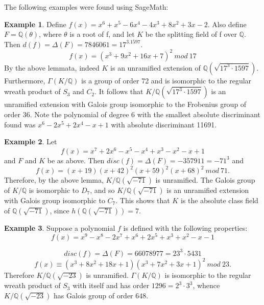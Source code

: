 \documentclass[12pt]{extarticle}
\newcommand{\Q}{\mathbb{Q}}
\newcommand{\<}{\langle}
\renewcommand{\>}{\rangle}
\theoremstyle{definition}
\newtheorem*{example}{Example}
\begin{document}
The following examples were found using SageMath:
\begin{example}
Define $f(x)=x^6 + x^5 - 6x^4 - 4x^3 + 8x^2 + 3x - 2$. Also define $F=\Q(\theta)$, where $\theta$ is a root of f, and let $K$ be the splitting field of f over $\Q$. Then $d(f)=\Delta(F)=7846061=17^3.1597$. 
\begin{equation}
   f(x)= (x^3 + 9x^2 + 16x + 7)^2\:mod\:17
\end{equation}
By the above lemmata, indeed $K$ is an unramified extension of $\Q(\sqrt{17^3 \cdot 1597})$. Furthermore, $\Gamma(K/\Q)$ is a group of order 72 and is isomorphic to the regular wreath product of $S_3$ and $C_2$. It follows that $K/\Q(\sqrt{17^3 \cdot 1597})$ is an unramified extension with Galois group isomorphic to the Frobenius group of order 36.
Note the polynomial of degree 6 with the smallest absolute discriminant found was $x^6 - 2x^5 + 2x^4 - x + 1$ with absolute discriminant 11691.
\end{example}
\begin{example}
 Let \begin{equation}
     f(x)=x^7 + 2x^6 - x^5 - x^4 + x^3 - x^2 - x + 1
 \end{equation}and $F$ and $K$ be as above.
Then $disc(f)=\Delta(F)=-357911=-71^{3}$ and
\begin{equation}
    f(x)=(x + 19)(x + 42)^2 (x + 59)^2(x + 68)^2\:mod\:71.
\end{equation}
Therefore, by the above lemma, $K/\Q(\sqrt{-71})$ is unramified. The Galois group of $K/\Q$
is isomorphic to $D_{7}$, and so $K/\Q(\sqrt{-71})$
is an unramified extension with Galois group isomorphic to $C_7$.
This shows that $K$ is the absolute class field of $\Q(\sqrt{-71})$, since $h(\Q(\sqrt{-71}))=7$.
\end{example}
\begin{example}
    Suppose a polynomial $f$ is defined with the following properties: \begin{equation}
        f(x) =x^9 - x^8 - 2x^7 + x^6 + 2x^5 + x^3 + x^2 - x - 1
    \end{equation} \par
    \begin{equation}
        disc(f)= \Delta(F)=66078977=23^3 \cdot 5431
    \end{equation} 
    \begin{equation}
        f(x)\equiv(x^3 + 8x^2 + 18x + 1)(x^3 + 7x^2 + 3x + 1)^2\:mod\:23.
    \end{equation}
Therefore  $K/\Q(\sqrt{-23})$ is unramified. $\Gamma(K/\Q)$ is isomorphic to the regular wreath product of $S_3$ with itself and has order $1296=2^3 \cdot 3^3$, whence $K/\Q(\sqrt{-23})$ has Galois group of order $648$.
\end{example}
\end{document}
